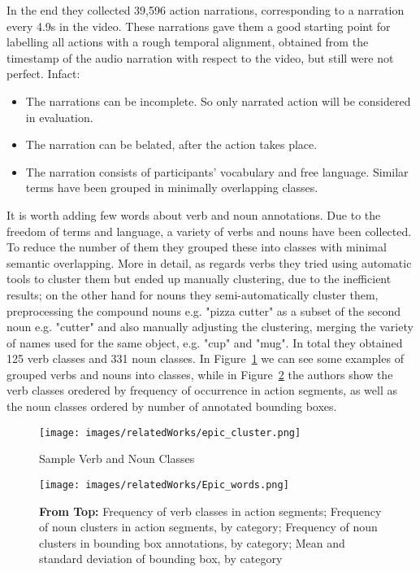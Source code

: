 In the end they collected 39,596 action narrations, corresponding to a narration
every 4.9s in the video. These narrations gave them a good starting point for labelling
all actions with a rough temporal alignment, obtained from the timestamp of the audio narration
with respect to the video, but still were not perfect. Infact:
\begin{itemize}
    \item The narrations can be incomplete. So only narrated action will be considered in evaluation.
    \item The narration can be belated, after the action takes place.
    \item The narration consists of participants' vocabulary and free language. Similar terms
    have been grouped in minimally overlapping classes.
\end{itemize}
It is worth adding few words about verb and noun annotations. Due to the freedom of 
terms and language, a variety of verbs and nouns have been collected. To reduce the number
of them they grouped these into classes with minimal semantic overlapping. More in detail,
as regards verbs they tried using automatic tools to cluster them but ended up manually
clustering, due to the inefficient results; on the other hand for nouns they semi-automatically
cluster them, preprocessing the compound nouns e.g. "pizza cutter" as a subset  of the second 
noun e.g. "cutter" and also manually adjusting the clustering, merging the variety of 
names used for the same object, e.g. "cup" and "mug". In total they obtained 125 verb classes and
331 noun classes. In Figure~\ref{fig:epic_table} we can see some examples of grouped verbs and
nouns into classes, while in Figure~\ref{fig:epic_freq} the authors show the verb classes
oredered by frequency of occurrence in action segments, as well as the noun classes
ordered by number of annotated bounding boxes.

\begin{figure}
    \centering
    \texttt{[image: images/relatedWorks/epic\_cluster.png]} %
    \caption{Sample Verb and Noun Classes}\label{fig:epic_table}
\end{figure}
\begin{figure}
    \centering
    \texttt{[image: images/relatedWorks/Epic\_words.png]} %
    \caption{\textbf{From Top:} Frequency of verb classes in action segments;
        Frequency of noun clusters in action segments, by category; Frequency of noun
        clusters in bounding box annotations, by category; Mean and standard deviation of
        bounding box, by category}\label{fig:epic_freq}
\end{figure}

